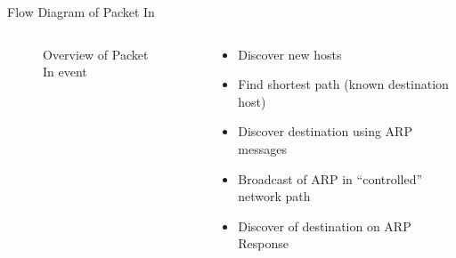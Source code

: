 \documentclass{beamer}
\begin{document}
\begin{frame}{Flow Diagram of Packet In}
\begin{columns}
\begin{column}{0.5\textwidth}
\begin{figure}
	  \caption{Overview of Packet In event}
	  \end{figure}
    \end{column}    
    \begin{column}{0.5\textwidth}
      \begin{itemize}
      \item Discover new hosts
      \item Find shortest path (known destination host)
      \item Discover destination using ARP messages
      \item Broadcast of ARP in ``controlled'' network path
      \item Discover of destination on ARP Response
      \end{itemize}
    \end{column}
  \end{columns}
\end{frame}
\end{document}

